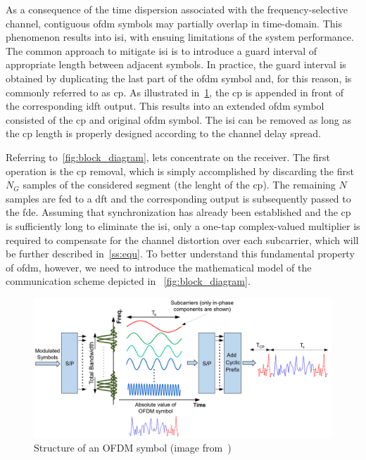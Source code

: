 As a consequence of the time dispersion associated with the frequency-selective channel, contiguous \gls{ofdm} symbols may partially overlap in time-domain. This phenomenon results into \gls{isi}, with ensuing limitations of the system performance. The common approach to mitigate \gls{isi} is to introduce a guard interval of appropriate length between adjacent symbols. In practice, the guard interval is obtained by duplicating the last part of the \gls{ofdm} symbol and, for this reason, is commonly referred to as \gls{cp}.
As illustrated in~\cref{fig:cp}, the \gls{cp} is appended in front of the corresponding \gls{idft} output. This results into an extended \gls{ofdm} symbol consisted of the \gls{cp} and original \gls{ofdm} symbol. The \gls{isi} can be removed as long as the \gls{cp} length is properly designed according to the channel delay spread.

Referring to~\cref{fig:block_diagram}, lets concentrate on the receiver. The first operation is the \gls{cp} removal, which is simply accomplished by discarding the first $N_G$ samples of the considered segment (the lenght of the \gls{cp}). The remaining $N$ samples are fed to a \gls{dft} and the corresponding output is subsequently passed to the \gls{fde}. Assuming that synchronization has already been established and the \gls{cp} is sufficiently long to eliminate the \gls{isi}, only a one-tap complex-valued multiplier is required to compensate for the channel distortion over each subcarrier, which will be further described in~\cref{ss:equ}. To better understand this fundamental property of \gls{ofdm}, however, we need to introduce the mathematical model of the communication scheme depicted in ~\cref{fig:block_diagram}.
%
\begin{figure}[thb]
\centering
\includegraphics[width=1.00\linewidth]{figs/cp-ofdm_block.png}
\caption{Structure of an OFDM symbol (image from~\cite{arslan2020flexible})}\label{fig:cp}
\end{figure}



